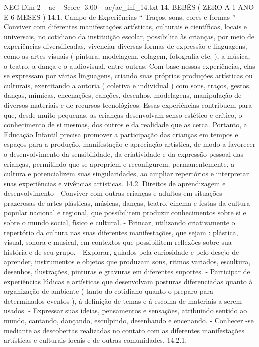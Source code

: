 \begin{textsample}{NEG Dim 2 – ac – Score -3.00 – ac/ac\_inf\_14.txt}  \label{ex:f2_neg_124}
14.
BEBÊS ( ZERO A 1 ANO E 6 MESES ) 14.1.
Campo de Experiências “ Traços, sons, cores e formas ” Conviver com diferentes manifestações artísticas, culturais e científicas, locais e universais, no cotidiano da instituição escolar, possibilita às crianças, por meio de experiências diversificadas, vivenciar diversas formas de expressão e linguagens, como as artes visuais ( pintura, modelagem, colagem, fotografia etc. ), a música, o teatro, a dança e o audiovisual, entre outras.
Com base nessas experiências, elas se expressam por várias linguagens, criando suas próprias produções artísticas ou culturais, exercitando a autoria ( coletiva e individual ) com sons, traços, gestos, danças, mímicas, encenações, canções, desenhos, modelagens, manipulação de diversos materiais e de recursos tecnológicos.
Essas experiências contribuem para que, desde muito pequenas, as crianças desenvolvam senso estético e crítico, o conhecimento de si mesmas, dos outros e da realidade que as cerca.
Portanto, a Educação Infantil precisa promover a participação das crianças em tempos e espaços para a produção, manifestação e apreciação artística, de modo a favorecer o desenvolvimento da sensibilidade, da criatividade e da expressão pessoal das crianças, permitindo que se apropriem e reconfigurem, permanentemente, a cultura e potencializem suas singularidades, ao ampliar repertórios e interpretar suas experiências e vivências artísticas. 14.2.
Direitos de aprendizagem e desenvolvimento - Conviver com outras crianças e adultos em situações prazerosas de artes plásticas, músicas, danças, teatro, cinema e festas da cultura popular nacional e regional, que possibilitem produzir conhecimentos sobre si e sobre o mundo social, físico e cultural. - Brincar, utilizando criativamente o repertório da cultura nas suas diferentes manifestações, que sejam : plástica, visual, sonora e musical, em contextos que possibilitem reflexões sobre sua história e de seu grupo. - Explorar, guiados pela curiosidade e pelo desejo de aprender, instrumentos e objetos que produzam sons, ritmos variados, escultura, desenhos, ilustrações, pinturas e gravuras em diferentes suportes. - Participar de experiências lúdicas e artísticas que desenvolvam posturas diferenciadas quanto à organização de ambiente ( tanto do cotidiano quanto o preparo para determinados eventos ), à definição de temas e à escolha de materiais a serem usados. - Expressar suas ideias, pensamentos e sensações, atribuindo sentido ao mundo, cantando, dançando, esculpindo, desenhando e encenando. - Conhecer -se mediante as descobertas realizadas no contato com as diferentes manifestações artísticas e culturais locais e de outras comunidades. 14.2.1.

\end{textsample}
